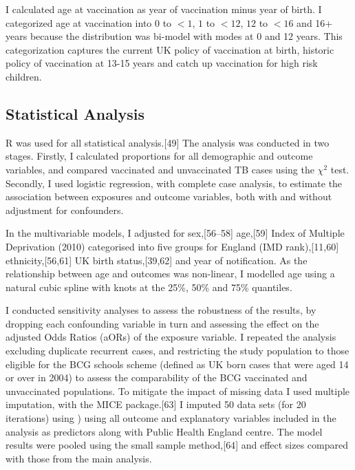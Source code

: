 \documentclass[11pt,twoside]{bristolthesis}
\begin{document}
  I calculated age at vaccination as year of vaccination minus year of birth. I categorized age at vaccination into \(0\) to \(< 1\), \(1\) to \(< 12\), \(12\) to \(< 16\) and 16+ years because the distribution was bi-model with modes at 0 and 12 years. This categorization captures the current UK policy of vaccination at birth, historic policy of vaccination at 13-15 years and catch up vaccination for high risk children.
  
  \hypertarget{statistical-analysis}{%
  \subsection{Statistical Analysis}\label{statistical-analysis}}
  
  R was used for all statistical analysis.{[}49{]} The analysis was conducted in two stages. Firstly, I calculated proportions for all demographic and outcome variables, and compared vaccinated and unvaccinated TB cases using the \(\chi ^2\) test. Secondly, I used logistic regression, with complete case analysis, to estimate the association between exposures and outcome variables, both with and without adjustment for confounders.
  
  In the multivariable models, I adjusted for sex,{[}56--58{]} age,{[}59{]} Index of Multiple Deprivation (2010) categorised into five groups for England (IMD rank),{[}11,60{]} ethnicity,{[}56,61{]} UK birth status,{[}39,62{]} and year of notification. As the relationship between age and outcomes was non-linear, I modelled age using a natural cubic spline with knots at the 25\%, 50\% and 75\% quantiles.
  
  I conducted sensitivity analyses to assess the robustness of the results, by dropping each confounding variable in turn and assessing the effect on the adjusted Odds Ratios (aORs) of the exposure variable. I repeated the analysis excluding duplicate recurrent cases, and restricting the study population to those eligible for the BCG schools scheme (defined as UK born cases that were aged 14 or over in 2004) to assess the comparability of the BCG vaccinated and unvaccinated populations. To mitigate the impact of missing data I used multiple imputation, with the MICE package.{[}63{]} I imputed 50 data sets (for 20 iterations) using ) using all outcome and explanatory variables included in the analysis as predictors along with Public Health England centre. The model results were pooled using the small sample method,{[}64{]} and effect sizes compared with those from the main analysis.
  
\end{document}
